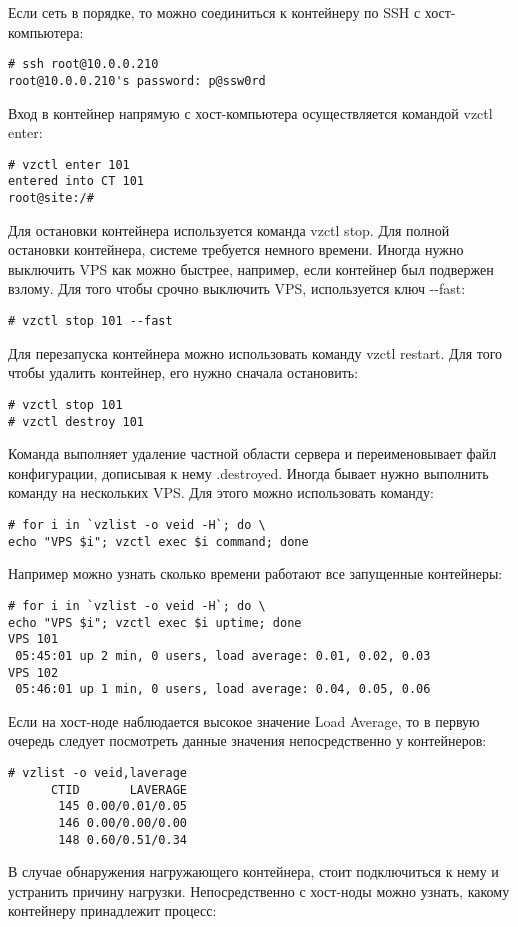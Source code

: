 Если сеть в порядке, то можно соединиться к контейнеру по SSH с хост-компьютера:
\begin{lstlisting}
# ssh root@10.0.0.210
root@10.0.0.210's password: p@ssw0rd
\end{lstlisting}
Вход в контейнер напрямую с хост-компьютера осуществляется командой vzctl enter:
\begin{lstlisting}
# vzctl enter 101
entered into CT 101
root@site:/#
\end{lstlisting}
Для остановки контейнера используется команда vzctl stop.
Для полной остановки контейнера, системе требуется немного времени.
Иногда нужно выключить VPS как можно быстрее, например, если контейнер был подвержен взлому.
Для того чтобы срочно выключить VPS, используется ключ -{}-fast:
\begin{lstlisting}
# vzctl stop 101 --fast
\end{lstlisting}
Для перезапуска контейнера можно использовать команду vzctl restart.
Для того чтобы удалить контейнер, его нужно сначала остановить:
\begin{lstlisting}
# vzctl stop 101
# vzctl destroy 101
\end{lstlisting}
Команда выполняет удаление частной области сервера и переименовывает файл конфигурации, дописывая к нему .destroyed.
Иногда бывает нужно выполнить команду на нескольких VPS.
Для этого можно использовать команду:
\begin{lstlisting}
# for i in `vzlist -o veid -H`; do \
echo "VPS $i"; vzctl exec $i command; done
\end{lstlisting}
Например можно узнать сколько времени работают все запущенные контейнеры:
\begin{lstlisting}
# for i in `vzlist -o veid -H`; do \
echo "VPS $i"; vzctl exec $i uptime; done
VPS 101
 05:45:01 up 2 min, 0 users, load average: 0.01, 0.02, 0.03
VPS 102
 05:46:01 up 1 min, 0 users, load average: 0.04, 0.05, 0.06
\end{lstlisting}
Если на хост-ноде наблюдается высокое значение Load Average, то в первую очередь следует посмотреть данные значения непосредственно у контейнеров:
\begin{lstlisting}
# vzlist -o veid,laverage
      CTID       LAVERAGE
       145 0.00/0.01/0.05
       146 0.00/0.00/0.00
       148 0.60/0.51/0.34
\end{lstlisting}
В случае обнаружения нагружающего контейнера, стоит подключиться к нему и устранить причину нагрузки.
Непосредственно с хост-ноды можно узнать, какому контейнеру принадлежит процесс:
